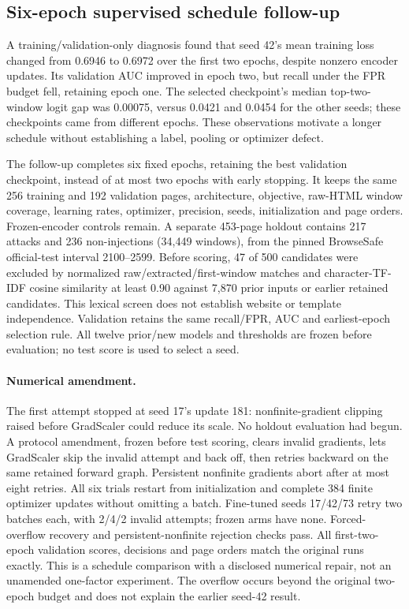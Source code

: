 \documentclass[11pt, a4paper]{article}
\begin{document}
\subsection{Six-epoch supervised schedule follow-up}
\label{sec:supervised-schedule}
A training/validation-only diagnosis found that seed 42's mean training
loss changed from 0.6946 to 0.6972 over the first two epochs, despite
nonzero encoder updates. Its validation AUC improved in epoch two, but
recall under the FPR budget fell, retaining epoch one. The selected
checkpoint's median top-two-window logit gap was 0.00075, versus
0.0421 and 0.0454 for the other seeds; these checkpoints came from
different epochs. These observations motivate a longer schedule without
establishing a label, pooling or optimizer defect.

The follow-up completes six fixed epochs, retaining the best validation
checkpoint, instead of at most two epochs with early stopping. It keeps
the same 256 training and 192 validation pages, architecture, objective,
raw-HTML window coverage, learning rates, optimizer, precision, seeds,
initialization and page orders. Frozen-encoder controls remain. A separate
453-page holdout contains 217 attacks and 236 non-injections (34,449
windows), from the pinned BrowseSafe official-test interval 2100--2599.
Before scoring, 47 of 500 candidates were excluded by normalized
raw/extracted/first-window matches and character-TF-IDF cosine similarity
at least 0.90 against 7,870 prior inputs or earlier retained candidates.
This lexical screen does not establish website or template independence.
Validation retains the same recall/FPR, AUC and earliest-epoch selection
rule. All twelve prior/new models and thresholds are frozen before
evaluation; no test score is used to select a seed.

\paragraph{Numerical amendment.}
The first attempt stopped at seed 17's update 181: nonfinite-gradient
clipping raised before GradScaler could reduce its scale. No holdout
evaluation had begun. A protocol amendment, frozen before test scoring,
clears invalid gradients, lets GradScaler skip the invalid attempt and
back off, then retries backward on the same retained forward graph.
Persistent nonfinite gradients abort after at most eight retries.
All six trials restart from initialization and complete 384 finite
optimizer updates without omitting a batch. Fine-tuned seeds 17/42/73
retry two batches each, with 2/4/2 invalid attempts; frozen arms have none.
Forced-overflow recovery and persistent-nonfinite rejection checks pass.
All first-two-epoch validation scores, decisions and page orders match
the original runs exactly. This is a schedule comparison with a disclosed
numerical repair, not an unamended one-factor experiment. The overflow
occurs beyond the original two-epoch budget and does not explain the
earlier seed-42 result.
\end{document}
